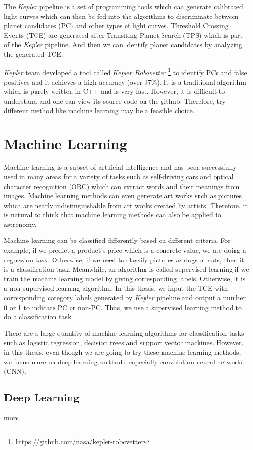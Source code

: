     The \textit{Kepler} pipeline is a set of programming tools which can generate
    calibrated light curves which can then be fed into the
    algorithms to discriminate between planet candidates (PC) and other types of light curves.
    Threshold Crossing Events (TCE) are generated
    after Transiting Planet Search (TPS) which is part of 
    the \textit{Kepler} pipeline. And then we can identify planet candidates
    by analyzing the generated TCE. 

    \textit{Kepler} team developed a tool called \textit{Kepler Robovetter} 
    \footnote{https://github.com/nasa/kepler-robovetter}
    to identify PCs and false positives and it achieves a high accuracy (over 97\%).
    It is a traditional algorithm which is purely written in C++ and 
    is very fast. However, it is difficult to understand
    and one can view its source code on the github. Therefore, try different method like 
    machine learning may be a feasible choice.
  
  \section{Machine Learning}
      Machine learning is a subset of artificial intelligence and has been successfully used 
      in many areas for a variety of tasks such as self-driving cars and optical character
      recognition (ORC) which can extract words and their meanings from images. Machine 
      learning methods can even generate art works such as pictures which are nearly 
      indistinguishable from art works created by artists. Therefore, it is natural to think 
      that machine learning methods can also be applied to astronomy. 

      Machine learning can be classified differently based on different criteria. For example,
      if we predict a product's price which is a concrete value, we are doing a regression task. 
      Otherwise, if we need to classify pictures as dogs or cats, then it is a classification 
      task. Meanwhile, an algorithm is called supervised learning if we train the machine 
      learning model by giving corresponding labels. Otherwise, it is a 
      non-supervised learning algorithm. In this thesis, we input the TCE with 
      corresponding category labels generated by 
      \textit{Kepler} pipeline and output a number 0 or 1 to indicate PC or non-PC. Thus,
      we use a supervised learning method to do a classification task.

      There are a large quantity of machine learning algorithms for classification tasks
      such as logistic regression, decision trees and support vector machines. However, 
      in this thesis, even though we are going to try these machine learning methods, we 
      focus more on deep learning methods, especially convolution neural networks (CNN).

      \subsection{Deep Learning}
        more

  